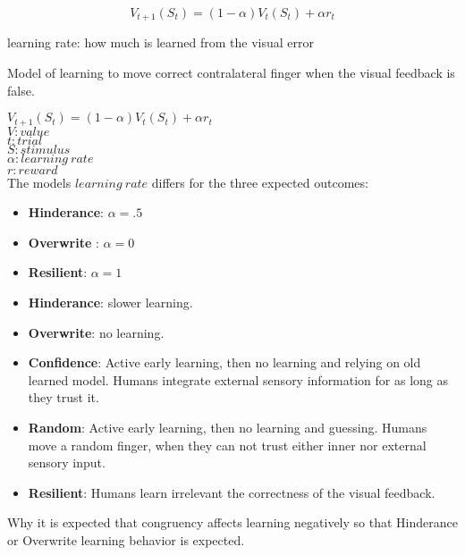 \documentclass[man]{apa7}
\begin{document}
\begin{equation} \label{equation1}
V_{t+1}(S_t)=(1-\alpha)V_t(S_t)+\alpha r_t    
\label{equ:equation2}
\end{equation}








learning rate: how much is learned from the visual error

Model of learning to move correct contralateral finger when the visual feedback is false.

$V_{t+1}(S_t)=(1-\alpha)V_t(S_t)+\alpha r_t$ \\
$V: value$ \\
$t: trial$ \\
$S: stimulus$ \\
$\alpha: learning\:rate$ \\
$r: reward$ \\

The models $learning\:rate$ differs for the three expected outcomes:
\begin{itemize}
    \item \textcolor{MyBlueDark}{\textbf{Hinderance}}: $\alpha = .5$
    \item \textcolor{MyBlueLight}{\textbf{Overwrite}} : $\alpha = 0$
    \item \textcolor{MyGray}{\textbf{Resilient}}: $\alpha = 1$
\end{itemize}   

\begin{itemize}
    \item \textbf{Hinderance}: slower learning.
    \item \textbf{Overwrite}: no learning.
    \item \textbf{Confidence}: Active early learning, then no learning and relying on old learned model. Humans integrate external sensory information for as long as they trust it.
    \item \textbf{Random}: Active early learning, then no learning and guessing. Humans move a random finger, when they can not trust either inner nor external sensory input.
    \item \textbf{Resilient}: Humans learn irrelevant the correctness of the visual feedback.
\end{itemize}

Why it is expected that congruency affects learning negatively so that Hinderance or Overwrite learning behavior is expected.
\end{document}
